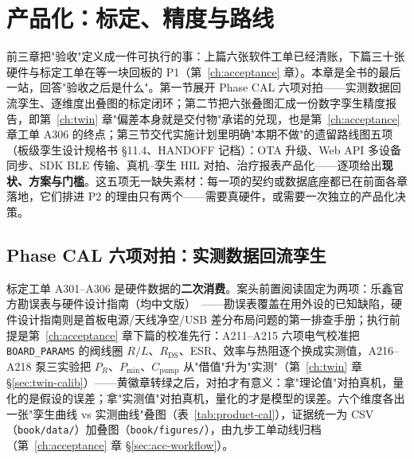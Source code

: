 \chapter{产品化：标定、精度与路线}
\label{ch:product}

前三章把"验收"定义成一件可执行的事：上篇六张软件工单已经清账，下篇三十张硬件与标定工单在等一块回板的 P1（第~\ref{ch:acceptance} 章）。本章是全书的最后一站，回答"验收之后是什么"。第一节展开 Phase CAL 六项对拍——实测数据回流孪生、逐维度出叠图的标定闭环；第二节把六张叠图汇成一份数字孪生精度报告，即第~\ref{ch:twin} 章"偏差本身就是交付物"承诺的兑现，也是第~\ref{ch:acceptance} 章工单 A306 的终点；第三节交代实施计划里明确"本期不做"的遗留路线图五项（板级孪生设计规格书 \S11.4、HANDOFF 记档）：OTA 升级、Web API 多设备同步、SDK BLE 传输、真机--孪生 HIL 对拍、治疗报表产品化——逐项给出\textbf{现状、方案与门槛}。这五项无一缺失素材：每一项的契约或数据底座都已在前面各章落地，它们排进 P2 的理由只有两个——需要真硬件，或需要一次独立的产品化决策。

\section{Phase CAL 六项对拍：实测数据回流孪生}
\label{sec:product-cal}

标定工单 A301--A306 是硬件数据的\textbf{二次消费}。案头前置阅读固定为两项：乐鑫官方勘误表与硬件设计指南（均中文版）~\cite{esp32s3-errata-cn,esp32s3-hw-guidelines-cn}——勘误表覆盖在用外设的已知缺陷，硬件设计指南则是首板电源/天线净空/USB 差分布局问题的第一排查手册；执行前提是第~\ref{ch:acceptance} 章下篇的校准先行：A211--A215 六项电气校准把 \texttt{BOARD\_PARAMS} 的阀线圈 $R/L$、$R_\text{DS}$、ESR、效率与热阻逐个换成实测值，A216--A218 泵三实验把 $P_R$、$P_\text{min}$、$C_\text{pump}$ 从"借值"升为"实测"（第~\ref{ch:twin} 章 \S\ref{sec:twin-calib}）——黄徽章转绿之后，对拍才有意义：拿"理论值"对拍真机，量化的是假设的误差；拿"实测值"对拍真机，量化的才是模型的误差。六个维度各出一张"孪生曲线 vs 实测曲线"叠图（表~\ref{tab:product-cal}），证据统一为 CSV（\texttt{book/data/}）加叠图（\texttt{book/figures/}），由九步工单动线归档（第~\ref{ch:acceptance} 章 \S\ref{sec:acc-workflow}）。

